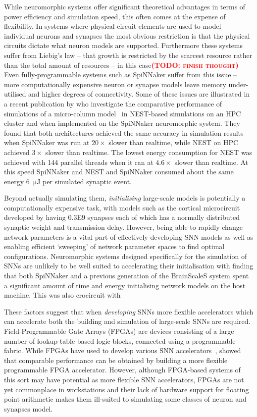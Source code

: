 \documentclass[utf8]{frontiersSCNS} %
\newcommand{\todo}[1]{\textbf{\textsc{\textcolor{red}{(TODO: #1)}}}}
\begin{document}
While neuromorphic systems offer significant theoretical advantages in terms of power efficiency and simulation speed, this often comes at the expense of flexibility.
In systems where physical circuit elements are used to model individual neurons and synapses the most obvious restriction is that the physical circuits dictate what neuron models are supported.
Furthermore these systems suffer from Liebig's law -- that growth is restricted by the scarcest resource rather than the total amount of resources -- in this case\todo{finish thought}
Even fully-programmable systems such as SpiNNaker suffer from this issue -- more computationally expensive neuron or synapse models leave memory under-utilised and higher degrees of connectivity.
Some of these issues are illustrated in a recent publication by \citet{VanAlbada2018} who investigate the comparative performance of simulations of a micro-column model~\citep{Potjans2012} in NEST-based simulations on an HPC cluster and when implemented on the SpiNNaker neuromorphic system.
They found that both architectures achieved the same accuracy in simulation results when SpiNNaker was run at $20\times$ slower than realtime, while NEST on HPC achieved $3\times$ slower than realtime. 
The lowest energy consumption for NEST was achieved with \num{144} parallel threads when it ran at $4.6\times$ slower than realtime. 
At this speed SpiNNaker and NEST and SpiNNaker consumed about the same energy \SI{6}{\micro\joule} per simulated synaptic event.

Beyond actually simulating them, \textit{initialising} large-scale models is potentially a computationally expensive task, with models such as the cortical microcircuit developed by \citet{Potjans2012} having \num{0.3E9} synapses each of which has a normally distributed synaptic weight and transmission delay.
However, being able to rapidly change network parameters is a vital part of effectively developing SNN models as well as enabling efficient `sweeping' of network parameter spaces to find optimal configurations. 
Neuromorphic systems designed specifically for the simulation of SNNs are unlikely to be well suited to accelerating their initialisation with \citet{Diamond2018} finding that both SpiNNaker and a previous generation of the BrainScaleS system spent a significant amount of time and energy initialising network models on the host machine. 
This was also  \citet{VanAlbada2018} crocircuit with 

These factors suggest that when \textit{developing} SNNs more flexible accelerators which can accelerate both the building and simulation of large-scale SNNs are required.
Field-Programmable Gate Arrays (FPGAs) are devices consisting of a large number of lookup-table based logic blocks, connected using a programmable fabric.
While FPGAs have used to develop various SNN accelerators~\citep{Moore2012,Wang2018}, \citet{Naylor2013} showed that comparable performance can be obtained by building a more flexible programmable FPGA accelerator.
However, although FPGA-based systems of this sort may have potential as more flexible SNN accelerators, FPGAs are not yet commonplace in workstations and their lack of hardware support for floating point arithmetic makes them ill-suited to simulating some classes of neuron and synapses model. 
\end{document}
